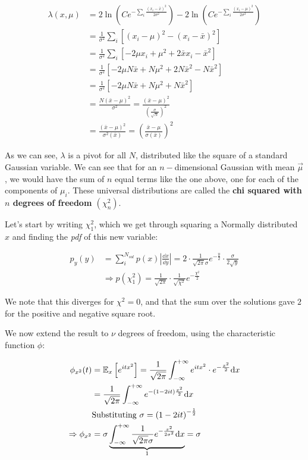 	\begin{align*}
		\lambda(x,\mu) &= 2\ln\left(Ce^{-\sum_i\frac{(x_i-\bar{x})^2}{2\sigma^2}}\right) - 2\ln\left(C e^{-\sum_i \frac{(x_i-\mu)^2}{2\sigma^2}}\right)\\
		&= \frac{1}{\sigma^2}\sum_i\left[(x_i-\mu)^2-(x_i-\bar{x})^2\right] \\
		&= \frac{1}{\sigma^2}\sum_i\left[-2\mu x_i + \mu^2 +2\bar{x}x_i -\bar{x}^2\right] \\
		&= \frac{1}{\sigma^2}\left[-2\mu N\bar{x} + N\mu^2 +2N\bar{x}^2 -N\bar{x}^2\right] \\
		&= \frac{1}{\sigma^2}\left[-2\mu N\bar{x} + N\mu^2 +N\bar{x}^2\right]\\
		&= \frac{N\left(\bar{x} -\mu\right)^2}{\sigma^2} = \frac{\left(\bar{x}-\mu\right)^2}{\left(\frac{\sigma}{\sqrt{N}}\right)^2} \\
		&= \frac{\left(\bar{x} - \mu \right)^2}{\sigma^2(\bar{x})} = \left(\frac{\bar{x}-\mu}{\sigma(\bar{x})}\right)^2
	\end{align*}
	
As we can see, $\lambda$ is a pivot for all $N$, distributed like the square of a standard Gaussian variable. We can see that for an $n-$dimensional Gaussian with mean $\vec{\mu}$, we would have the sum of $n$ equal terms like the one above, one for each of the components of $\mu_i$. These universal distributions are called the \textbf{chi squared with $n$ degrees of freedom $\left(\chi^2_n\right)$}.
	
Let's start by writing $\chi^2_1$, which we get through squaring a Normally distributed $x$ and finding the \emph{pdf} of this new variable:
	
	\begin{align*}
		p_y(y) &= \sum_i^{N_{sol}} p(x) \left|\frac{\dd x}{\dd y}\right| = 2\cdot\frac{1}{\sqrt{2\pi}\sigma}e^{-\frac{y}{2}}\cdot\frac{\sigma}{2\sqrt{y}}\\
		&\Rightarrow p(\chi_1^2) = \frac{1}{\sqrt{2\pi}} \cdot \frac{1}{\sqrt{\chi^2}}e^{-\frac{\chi^2}{2}}
	\end{align*} 
	
We note that this diverges for $\chi^2=0$, and that the sum over the solutions gave $2$ for the positive and negative square root. 
	
We now extend the result to $\nu$ degrees of freedom, using the characteristic function $\phi$:
	
	\begin{align*}
		\phi_{x^2}(t) &= \mathbb{E}_x\left[e^{itx^2}\right] = \frac{1}{\sqrt{2\pi}}\int_{-\infty}^{+\infty}e^{itx^2}\cdot e^{-\frac{x^2}{2}}\mathrm{d} x\\
		&= \frac{1}{\sqrt{2\pi}}\int_{-\infty}^{+\infty}e^{-\left(1-2it\right)\frac{x^2}{2}}\mathrm{d} x \\
		&\text{Substituting } \sigma= \left(1-2it\right)^{-\frac{1}{2}}\\
		\Rightarrow \phi_{x^2} &=\sigma\underbrace{\int_{-\infty}^{+\infty}\frac{1}{\sqrt{2\pi}\sigma}e^{-\frac{x^2}{2\sigma^2}}\mathrm{d} x}_{1} = \sigma
	\end{align*}
	
